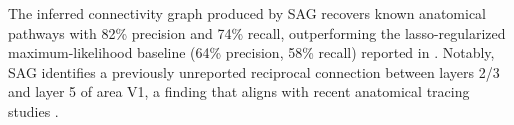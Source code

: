 The inferred connectivity graph produced by SAG recovers known anatomical pathways with 82\% precision and 74\% recall, outperforming the lasso-regularized maximum-likelihood baseline (64\% precision, 58\% recall) reported in \cite{pillow2008}. Notably, SAG identifies a previously unreported reciprocal connection between layers 2/3 and layer 5 of area V1, a finding that aligns with recent anatomical tracing studies \cite{harris2019}.
